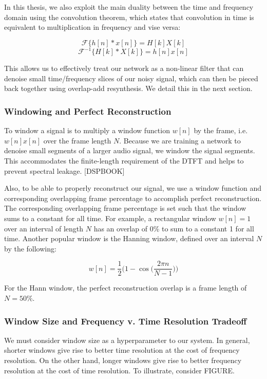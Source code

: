 In this thesis, we also exploit the main duality between the time and frequency domain using the convolution theorem, which states that convolution in time is equivalent to multiplication in frequency and vise versa:

\begin{equation}
\mathscr{F} \{h[n] * x[n]\} = H[k] X[k]
\end{equation}
\begin{equation}
\mathscr{F}^{-1} \{H[k] * X[k]\} = h[n] x[n]
\end{equation}

This allows us to effectively treat our network as a non-linear filter that can denoise small time/frequency slices of our noisy signal, which can then be pieced back together using overlap-add resynthesis. We detail this in the next section.

\subsubsection{Windowing and Perfect Reconstruction}
To window a signal is to multiply a window function $w[n]$ by the frame, i.e. $w[n]x[n]$ over the frame length $N$. Because we are training a network to denoise small segments of a larger audio signal, we window the signal segments. This accommodates the finite-length requirement of the DTFT and helps to prevent spectral leakage. [DSPBOOK]

Also, to be able to properly reconstruct our signal, we use a window function and corresponding overlapping frame percentage to accomplish perfect reconstruction. The corresponding overlapping frame percentage is set such that the window sums to a constant for all time. For example, a rectangular window $w[n]=1$ over an interval of length $N$ has an overlap of 0\% to sum to a constant 1 for all time. Another popular window is the Hanning window, defined over an interval $N$ by the following:

\begin{equation}
w[n] = \dfrac{1}{2} \bigg( 1-\cos \bigg(\dfrac{2 \pi n}{N - 1} \bigg)\bigg)
\end{equation}

For the Hann window, the perfect reconstruction overlap is a frame length of $N=50\%$.

\subsubsection{Window Size and Frequency v. Time Resolution Tradeoff}
We must consider window size as a hyperparameter to our system. In general, shorter windows give rise to better time resolution at the cost of frequency resolution. On the other hand, longer windows give rise to better frequency resolution at the cost of time resolution. To illustrate, consider FIGURE.



